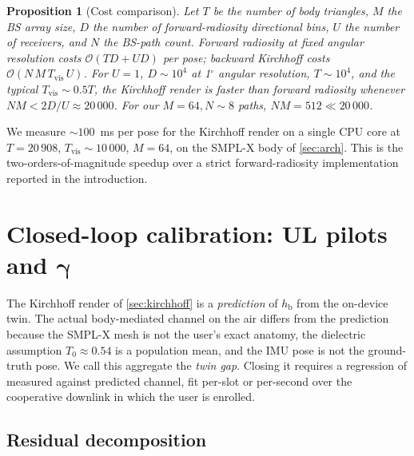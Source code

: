 \documentclass[journal,twocolumn,10pt]{IEEEtran}
\theoremstyle{plain}
\newtheorem{proposition}[theorem]{Proposition}
\theoremstyle{definition}
\theoremstyle{remark}
\newcommand{\gammab}{\bm{\gamma}}
\newcommand{\hbody}{h_{\mathrm{b}}}
\newcommand{\Tepskin}{T_{0}}
\begin{document}
\begin{proposition}[Cost comparison]\label{prop:cost}
Let $T$ be the number of body triangles, $M$ the BS array size, $D$
the number of forward-radiosity directional bins, $U$ the number of
receivers, and $N$ the BS-path count. Forward radiosity at fixed
angular resolution costs $\mathcal{O}(T D + U D)$ per pose; backward
Kirchhoff costs $\mathcal{O}(N\,M\,T_{\mathrm{vis}}\,U)$. For
$U = 1$, $D \sim 10^{4}$ at 1$^{\circ}$ angular resolution, $T \sim
10^{4}$, and the typical $T_{\mathrm{vis}} \sim 0.5T$, the
Kirchhoff render is faster than forward radiosity whenever
$N M < 2D / U \approx 20\,000$. For our $M = 64, N \sim 8$ paths,
$NM = 512 \ll 20\,000$.
\end{proposition}

We measure $\sim\!100$~ms per pose for the Kirchhoff render on a
single CPU core at $T = 20\,908$, $T_{\mathrm{vis}} \sim 10\,000$,
$M = 64$, on the SMPL-X body of \cref{sec:arch}. This is the
two-orders-of-magnitude speedup over a strict forward-radiosity
implementation reported in the introduction.


\section{Closed-loop calibration: UL pilots and \texorpdfstring{$\gammab$}{gamma}}\label{sec:closed-loop}

The Kirchhoff render of \cref{sec:kirchhoff} is a \emph{prediction}
of $\hbody$ from the on-device twin. The actual body-mediated channel
on the air differs from the prediction because the SMPL-X mesh is
not the user's exact anatomy, the dielectric assumption $\Tepskin
\approx 0.54$ is a population mean, and the IMU pose is not the
ground-truth pose. We call this aggregate the \emph{twin gap}.
Closing it requires a regression of measured against predicted
channel, fit per-slot or per-second over the cooperative downlink
in which the user is enrolled.

\subsection{Residual decomposition}
\end{document}
